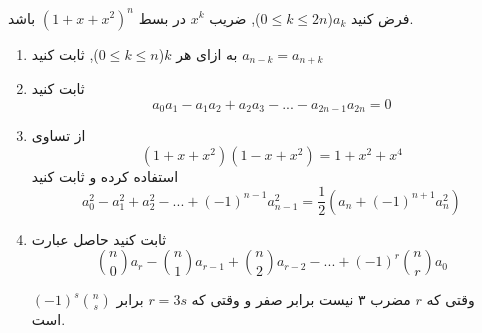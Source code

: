     فرض کنید $a_k$($0 \leq k \leq 2n$), ضریب $x^k$ در بسط $(1 + x + x^2)^n$ باشد.
	\begin{enumerate}
        \item
    	به ازای هر $k$($0 \leq k \leq n$), ثابت کنید $a_{n-k} = a_{n+k}$
    	\item
    	ثابت کنید
        $$a_0a_1 - a_1a_2 + a_2a_3 - ... - a_{2n-1}a_{2n} = 0$$
    	\item
    	از تساوی
    	$$(1 + x + x^2)(1 - x + x^2) = 1 + x^2 + x^4$$
    	استفاده کرده و ثابت کنید
    	$$a_0^2 - a_1^2 + a_2^2 - ... + (-1)^{n - 1}a_{n - 1}^2 = \frac{1}{2}(a_n + (-1)^{n + 1}a_n^2)$$
    	\item
    	ثابت کنید حاصل عبارت
        $${n \choose 0}a_r - {n \choose 1}a_{r - 1} + {n \choose 2}a_{r - 2} - ... + (-1)^r{n \choose r}a_0$$
        
    	وقتی که $r$ مضرب ۳ نیست برابر صفر و وقتی که $r = 3s$ برابر $(-1)^s{n \choose s}$ است.
	\end{enumerate}
